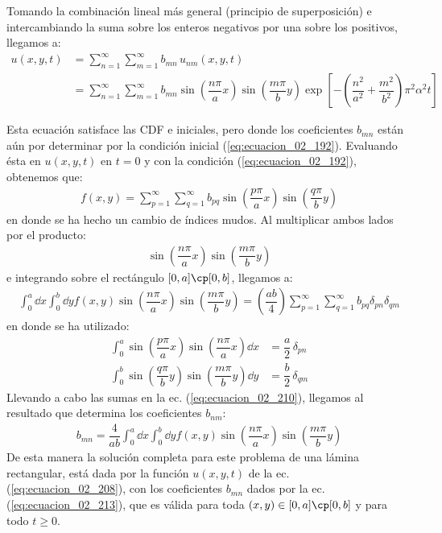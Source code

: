 Tomando la combinación lineal más general (principio de superposición) e intercambiando la suma sobre los enteros negativos por una sobre los positivos, llegamos a:
\begin{align}
u(x, y, t) &= \sum_{n=1}^{\infty} \sum_{m=1}^{\infty} b_{mn} \, u_{nm} (x, y, t) \label{eq:ecuacion_02_207} \\[0.5em]
&= \sum_{n=1}^{\infty} \sum_{m=1}^{\infty} b_{mn} \sin \left( \dfrac{n \pi}{a} x \right) \sin \left( \dfrac{m \pi}{b} y \right) \exp\left[ - \left( \dfrac{n^{2}}{a^{2}} {+} \dfrac{m^{2}}{b^{2}} \right) \pi^{2} \alpha^{2} t \right] \label{eq:ecuacion_02_208}
\end{align}

Esta ecuación satisface las CDF e iniciales, pero donde los coeficientes $b_{mn}$ están aún por determinar por la condición inicial (\ref{eq:ecuacion_02_192}). Evaluando ésta en $u(x, y, t)$ en $t = 0$ y con la condición (\ref{eq:ecuacion_02_192}), obtenemos que:
\begin{align}
f(x,y) = \sum_{p=1}^{\infty} \sum_{q=1}^{\infty} b_{pq} \sin \left( \dfrac{p \pi}{a} x \right) \sin \left( \dfrac{q \pi}{b} y \right) 
\end{align}
en donde se ha hecho un cambio de índices mudos. Al multiplicar ambos lados por el producto:
\begin{align*}
\sin \left( \dfrac{n \pi}{a} x \right) \sin \left( \dfrac{m \pi}{b} y \right) 
\end{align*}
e integrando sobre el rectángulo $[0, a] \cp [0, b]$, llegamos a:
\begin{align}
\int_{0}^{a} \dd{x} \int_{0}^{b} \dd{y} f(x, y) \sin \left( \dfrac{n \pi}{a} x \right) \sin \left( \dfrac{m \pi}{b} y \right) = \left( \dfrac{a b}{4} \right) \sum_{p=1}^{\infty} \sum_{q=1}^{\infty} b_{pq} \delta_{pn} \delta_{qm}
\label{eq:ecuacion_02_210}
\end{align}
en donde se ha utilizado:
\begin{align}
\int_{0}^{a} \sin \left( \dfrac{p \pi}{a} x \right) \sin \left( \dfrac{n \pi}{a} x \right) \dd{x} &= \dfrac{a}{2} \, \delta_{pn} \label{eq:ecuacion_02_211} \\[0.5em]
\int_{0}^{b} \sin \left( \dfrac{q \pi}{b} y \right) \sin \left( \dfrac{m \pi}{b} y \right) \dd{y} &= \dfrac{b}{2} \, \delta_{qm} \label{eq:ecuacion_02_212}
\end{align}
Llevando a cabo las sumas en la ec. (\ref{eq:ecuacion_02_210}), llegamos al resultado que determina los coeficientes $b_{nm}$:
\begin{align}
b_{mn} = \dfrac{4}{ab} \int_{0}^{a} \dd{x} \int_{0}^{b} \dd{y} f(x, y) \sin \left( \dfrac{n \pi}{a} x \right) \sin \left( \dfrac{m \pi}{b} y \right)
\label{eq:ecuacion_02_213}
\end{align}
De esta manera la solución completa para este problema de una lámina rectangular, está dada por la función $u(x, y, t)$ de la ec. (\ref{eq:ecuacion_02_208}), con los coeficientes $b_{mn}$ dados por la ec. (\ref{eq:ecuacion_02_213}), que es válida para toda $(x, y) \in [0, a] \cp [0, b]$ y para todo $t \geq 0$. 

